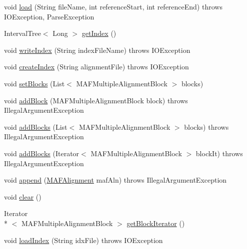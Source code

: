 \begin{DoxyCompactItemize}
\item 
void \hyperlink{classbroad_1_1core_1_1multiplealignment_1_1_m_a_f_alignment_a89bbe99ce17f99676baef7dbd7f56b8c}{load} (String file\+Name, int reference\+Start, int reference\+End)  throws I\+O\+Exception, Parse\+Exception 
\item 
Interval\+Tree$<$ Long $>$ \hyperlink{classbroad_1_1core_1_1multiplealignment_1_1_m_a_f_alignment_ad3dca7634a26f2abfe8d5bbe74b5215c}{get\+Index} ()
\item 
void \hyperlink{classbroad_1_1core_1_1multiplealignment_1_1_m_a_f_alignment_a9a771d215aa4d605d2f3693805dd342f}{write\+Index} (String index\+File\+Name)  throws I\+O\+Exception 
\item 
void \hyperlink{classbroad_1_1core_1_1multiplealignment_1_1_m_a_f_alignment_a8255b00582e0e79db7e00ab566790d19}{create\+Index} (String alignment\+File)  throws I\+O\+Exception 
\item 
void \hyperlink{classbroad_1_1core_1_1multiplealignment_1_1_m_a_f_alignment_adddb5268d348456bc61cf6d66845fe2f}{set\+Blocks} (List$<$ M\+A\+F\+Multiple\+Alignment\+Block $>$ blocks)
\item 
void \hyperlink{classbroad_1_1core_1_1multiplealignment_1_1_m_a_f_alignment_aa1a8ed0a772add5b0c8846d67f86c138}{add\+Block} (M\+A\+F\+Multiple\+Alignment\+Block block)  throws Illegal\+Argument\+Exception
\item 
void \hyperlink{classbroad_1_1core_1_1multiplealignment_1_1_m_a_f_alignment_a76f2ad2df4c54f3e035dc6ac5e7cf8b0}{add\+Blocks} (List$<$ M\+A\+F\+Multiple\+Alignment\+Block $>$ blocks)  throws Illegal\+Argument\+Exception 
\item 
void \hyperlink{classbroad_1_1core_1_1multiplealignment_1_1_m_a_f_alignment_ac151b72bade2481ac9d5e8754ce7a056}{add\+Blocks} (Iterator$<$ M\+A\+F\+Multiple\+Alignment\+Block $>$ block\+It)  throws Illegal\+Argument\+Exception
\item 
void \hyperlink{classbroad_1_1core_1_1multiplealignment_1_1_m_a_f_alignment_a0f48219a08aeee846296df3a3f6c4bbe}{append} (\hyperlink{classbroad_1_1core_1_1multiplealignment_1_1_m_a_f_alignment}{M\+A\+F\+Alignment} maf\+Aln)  throws Illegal\+Argument\+Exception
\item 
void \hyperlink{classbroad_1_1core_1_1multiplealignment_1_1_m_a_f_alignment_a3dbdfe66d00c1a1dd2abe810f50d8887}{clear} ()
\item 
Iterator\\*
$<$ M\+A\+F\+Multiple\+Alignment\+Block $>$ \hyperlink{classbroad_1_1core_1_1multiplealignment_1_1_m_a_f_alignment_a7e31cd45e98145f4638106f2d3a54986}{get\+Block\+Iterator} ()
\item 
void \hyperlink{classbroad_1_1core_1_1multiplealignment_1_1_m_a_f_alignment_af9d98ead09574db2340b104164ba960a}{load\+Index} (String idx\+File)  throws I\+O\+Exception 
\end{DoxyCompactItemize}
